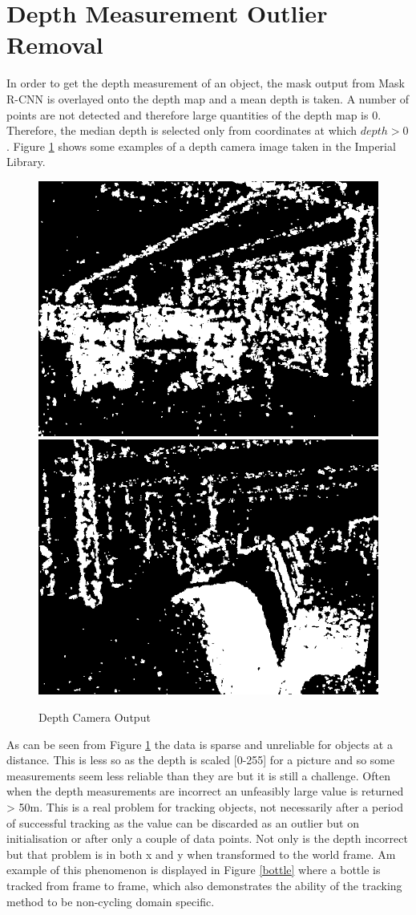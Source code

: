 \documentclass[11pt,twoside]{report}
\begin{document}
\section{Depth Measurement Outlier Removal} \label{Depth_approx}

In order to get the depth measurement of an object, the mask output from Mask R-CNN is overlayed onto the depth map and a mean depth is taken. A number of points are not detected and therefore large quantities of the depth map is 0. Therefore, the median depth is selected only from coordinates at which $depth>0$. Figure \ref{DCO} shows some examples of a depth camera image taken in the Imperial Library.

\noindent \begin{figure}[h!]
	\includegraphics[width = 0.5\hsize]{figures/depth_image_1.png}
	\includegraphics[width = 0.5\hsize]{figures/depth_image_2.png}
	\caption{Depth Camera Output}
	\label{DCO}
\end{figure}

As can be seen from Figure \ref{DCO} the data is sparse and unreliable for objects at a distance. This is less so as the depth is scaled [0-255] for a picture and so some measurements seem less reliable than they are but it is still a challenge. Often when the depth measurements are incorrect an unfeasibly large value is returned > 50m. This is a real problem for tracking objects, not necessarily after a period of successful tracking as the value can be discarded as an outlier but on initialisation or after only a couple of data points. Not only is the depth incorrect but that problem is in both x and y when transformed to the world frame. Am example of this phenomenon is displayed in Figure \ref{bottle} where a bottle is tracked from frame to frame, which also demonstrates the ability of the tracking method to be non-cycling domain specific.
\end{document}
